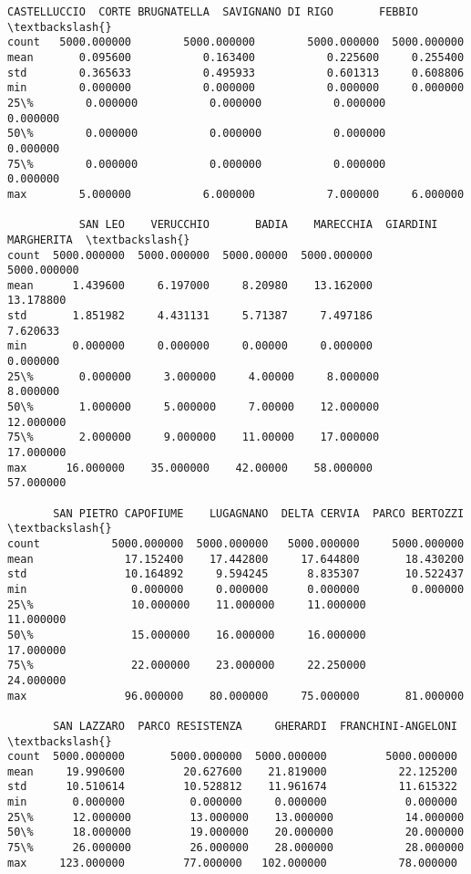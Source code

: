 \documentclass[11pt]{article}
\makeatletter
\newcommand{\boxspacing}{\kern\kvtcb@left@rule\kern\kvtcb@boxsep}
\newcommand{\prompt}[4]{
        {\ttfamily\llap{{\color{#2}[#3]:\hspace{3pt}#4}}\vspace{-\baselineskip}}
    }
\makeatother
\begin{document}
            \begin{tcolorbox}[breakable, size=fbox, boxrule=.5pt, pad at break*=1mm, opacityfill=0]
\prompt{Out}{outcolor}{24}{\boxspacing}
\begin{Verbatim}[commandchars=\\\{\}]
       CASTELLUCCIO  CORTE BRUGNATELLA  SAVIGNANO DI RIGO       FEBBIO  \textbackslash{}
count   5000.000000        5000.000000        5000.000000  5000.000000
mean       0.095600           0.163400           0.225600     0.255400
std        0.365633           0.495933           0.601313     0.608806
min        0.000000           0.000000           0.000000     0.000000
25\%        0.000000           0.000000           0.000000     0.000000
50\%        0.000000           0.000000           0.000000     0.000000
75\%        0.000000           0.000000           0.000000     0.000000
max        5.000000           6.000000           7.000000     6.000000

           SAN LEO    VERUCCHIO       BADIA    MARECCHIA  GIARDINI MARGHERITA  \textbackslash{}
count  5000.000000  5000.000000  5000.00000  5000.000000          5000.000000
mean      1.439600     6.197000     8.20980    13.162000            13.178800
std       1.851982     4.431131     5.71387     7.497186             7.620633
min       0.000000     0.000000     0.00000     0.000000             0.000000
25\%       0.000000     3.000000     4.00000     8.000000             8.000000
50\%       1.000000     5.000000     7.00000    12.000000            12.000000
75\%       2.000000     9.000000    11.00000    17.000000            17.000000
max      16.000000    35.000000    42.00000    58.000000            57.000000

       SAN PIETRO CAPOFIUME    LUGAGNANO  DELTA CERVIA  PARCO BERTOZZI  \textbackslash{}
count           5000.000000  5000.000000   5000.000000     5000.000000
mean              17.152400    17.442800     17.644800       18.430200
std               10.164892     9.594245      8.835307       10.522437
min                0.000000     0.000000      0.000000        0.000000
25\%               10.000000    11.000000     11.000000       11.000000
50\%               15.000000    16.000000     16.000000       17.000000
75\%               22.000000    23.000000     22.250000       24.000000
max               96.000000    80.000000     75.000000       81.000000

       SAN LAZZARO  PARCO RESISTENZA     GHERARDI  FRANCHINI-ANGELONI  \textbackslash{}
count  5000.000000       5000.000000  5000.000000         5000.000000
mean     19.990600         20.627600    21.819000           22.125200
std      10.510614         10.528812    11.961674           11.615322
min       0.000000          0.000000     0.000000            0.000000
25\%      12.000000         13.000000    13.000000           14.000000
50\%      18.000000         19.000000    20.000000           20.000000
75\%      26.000000         26.000000    28.000000           28.000000
max     123.000000         77.000000   102.000000           78.000000


\end{Verbatim}
\end{tcolorbox}
\end{document}
